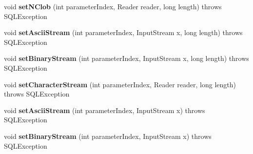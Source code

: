 \begin{DoxyCompactItemize}
\item 
\mbox{\label{classcom_1_1mysql_1_1jdbc_1_1jdbc2_1_1optional_1_1_j_d_b_c4_prepared_statement_wrapper_ae722ca270e44985851e904a26e9c354c}} 
void {\bfseries set\+N\+Clob} (int parameter\+Index, Reader reader, long length)  throws S\+Q\+L\+Exception 
\item 
\mbox{\label{classcom_1_1mysql_1_1jdbc_1_1jdbc2_1_1optional_1_1_j_d_b_c4_prepared_statement_wrapper_a70eae9262a1c2d61cf4cff588e76a1cd}} 
void {\bfseries set\+Ascii\+Stream} (int parameter\+Index, Input\+Stream x, long length)  throws S\+Q\+L\+Exception 
\item 
\mbox{\label{classcom_1_1mysql_1_1jdbc_1_1jdbc2_1_1optional_1_1_j_d_b_c4_prepared_statement_wrapper_aff4a26fe8d1d537f5d3076ff5c0e9652}} 
void {\bfseries set\+Binary\+Stream} (int parameter\+Index, Input\+Stream x, long length)  throws S\+Q\+L\+Exception 
\item 
\mbox{\label{classcom_1_1mysql_1_1jdbc_1_1jdbc2_1_1optional_1_1_j_d_b_c4_prepared_statement_wrapper_a6197db7085ffefd0755f5d8fcaee22df}} 
void {\bfseries set\+Character\+Stream} (int parameter\+Index, Reader reader, long length)  throws S\+Q\+L\+Exception 
\item 
\mbox{\label{classcom_1_1mysql_1_1jdbc_1_1jdbc2_1_1optional_1_1_j_d_b_c4_prepared_statement_wrapper_ab0a97ada3f1b34fcdc29fac11b0aa498}} 
void {\bfseries set\+Ascii\+Stream} (int parameter\+Index, Input\+Stream x)  throws S\+Q\+L\+Exception 
\item 
\mbox{\label{classcom_1_1mysql_1_1jdbc_1_1jdbc2_1_1optional_1_1_j_d_b_c4_prepared_statement_wrapper_a21e12d0fa38332ca3e47c88234a4b65d}} 
void {\bfseries set\+Binary\+Stream} (int parameter\+Index, Input\+Stream x)  throws S\+Q\+L\+Exception 
\item 

\end{DoxyCompactItemize}
